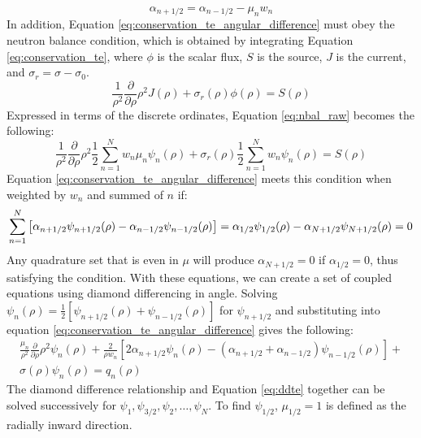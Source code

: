 \documentclass[11pt, oneside]{article}   	%
\begin{document}
%
\begin{equation}\label{eq:recursive_alpha}
\alpha_{n+1/2} = \alpha_{n-1/2}-\mu_n w_n
\end{equation}
%
In addition, Equation \ref{eq:conservation_te_angular_difference} must obey the neutron balance condition, which is obtained by integrating Equation \ref{eq:conservation_te}, where $\phi$ is the scalar flux, $S$ is the source, $J$ is the current, and $\sigma_r = \sigma - \sigma_0$.
%
\begin{equation}\label{eq:nbal_raw}
\frac{1}{\rho^2}\frac{\partial}{\partial\rho}\rho^2J(\rho)+
\sigma_r(\rho)\phi(\rho)=
S(\rho)
\end{equation}
%
Expressed in terms of the discrete ordinates, Equation \ref{eq:nbal_raw} becomes the following:
%
\begin{equation}\label{eq:nbal_disc}
\frac{1}{\rho^2}\frac{\partial}{\partial\rho}\rho^2\frac{1}{2}\sum_{n=1}^N{w_n\mu_n\psi_n(\rho)}+
\sigma_r(\rho)\frac{1}{2}\sum_{n=1}^N{w_n\psi_n(\rho)}=
S(\rho)
\end{equation}
%
Equation \ref{eq:conservation_te_angular_difference} meets this condition when weighted by $w_n$ and summed of $n$ if:
\newline
\begin{equation}\label{eq:alpha_nbal_condition}
\sum_{n=1}^N\left[\alpha_{n+1/2}\psi_{n+1/2}(\rho)-\alpha_{n-1/2}\psi_{n-1/2}(\rho)\right]=\\
\alpha_{1/2}\psi_{1/2}(\rho)-\alpha_{N+1/2}\psi_{N+1/2}(\rho)=0
\end{equation}
%
Any quadrature set that is even in $\mu$ will produce $\alpha_{N+1/2}=0$ if $\alpha_{1/2}=0$, thus satisfying the condition. With these equations, we can create a set of coupled equations using diamond differencing in angle. Solving $\psi_n(\rho)=\frac{1}{2}\left[\psi_{n+1/2}(\rho)+\psi_{n-1/2}(\rho)\right]$ for $\psi_{n+1/2}$ and substituting into equation \ref{eq:conservation_te_angular_difference} gives the following:
%
\begin{equation}\label{eq:ddte}
\begin{aligned}
\frac{\mu_n}{\rho^2}\frac{\partial}{\partial\rho}\rho^2\psi_n(\rho)+
\frac{2}{\rho w_n}\left[2\alpha_{n+1/2}\psi_{n}(\rho)-(\alpha_{n+1/2}+\alpha_{n-1/2})\psi_{n-1/2}(\rho)\right]+\\
\sigma(\rho)\psi_n(\rho) =
q_n(\rho)
\end{aligned}
\end{equation}
%
The diamond difference relationship and Equation \ref{eq:ddte} together can be solved successively for $\psi_1, \psi_{3/2}, \psi_2, \dots, \psi_N$. To find $\psi_{1/2}$, $\mu_{1/2}=1$ is defined as the radially inward direction.
\end{document}
